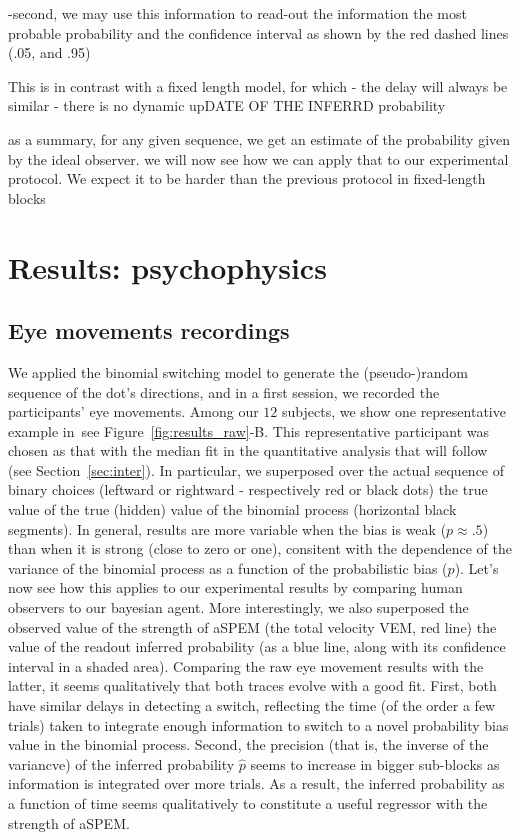 \documentclass[profile,final,english, draft]{article}%
\newcommand{\seeFig}[1]{see Figure~\ref{fig:#1}}
\newcommand{\seeSec}[1]{see Section~\ref{sec:#1}}
\begin{document}
-second, we may use this information to read-out the information the most probable probability and the confidence interval as shown by the red dashed lines (.05, and .95)


This is in contrast with a fixed length model, for which
- the delay will always be similar
- there is no dynamic upDATE OF THE INFERRD probability


as a summary, for any given sequence,
 we get an estimate of the probability given by the ideal observer.
 we will now see how we can apply that to our experimental protocol.
 We expect it to be harder than the previous protocol
 in fixed-length blocks

\section{Results: psychophysics}
\subsection{Eye movements recordings}
We applied the binomial switching model
to generate the (pseudo-)random sequence of
the dot's directions,
and in a first session, we recorded the participants' eye movements.
Among our $12$ subjects,
we show one representative example in~\seeFig{results_raw}-B.
This representative participant was chosen as that
with the median fit in the quantitative analysis
that will follow (\seeSec{inter}).
In particular, we superposed over the actual sequence of binary choices
(leftward or rightward - respectively red or black dots)
the true value of the true (hidden) value
of the binomial process (horizontal black segments).
In general, results are more variable when the bias is weak ($p\approx .5$)
than when it is strong (close to zero or one),
consitent with the dependence of the variance of the binomial process
as a function of the probabilistic bias ($p$).
Let's now see how this applies to our experimental results
by comparing human observers to our bayesian agent.
More interestingly, we also superposed
the observed value of the strength of aSPEM
(the total velocity VEM, red line)
the value of the readout inferred probability
(as a blue line, along with its confidence interval in a shaded area).
Comparing the raw eye movement results with the latter,
it seems qualitatively that both traces evolve with a good fit.
First, both have similar delays in detecting a switch,
reflecting the time (of the order a few trials) taken to integrate enough information
to switch to a novel probability bias value in the binomial process.
Second, the precision (that is, the inverse of the variancve)
of the inferred probability $\hat{p}$ seems to increase
in bigger sub-blocks as information is integrated over more trials.
As a result, the inferred probability as a function of time
seems qualitatively to constitute a useful regressor
with the strength of aSPEM.
\end{document}
